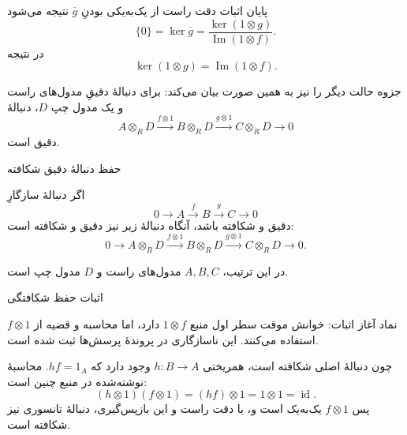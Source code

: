 \begin{frame}[t]{پایان اثبات دقت راست}
    \label{lec19:right-exact-conclusion}
    از یک‌به‌یکی بودنِ $\overline g$ نتیجه می‌شود
    \[
        \{0\}=\ker\overline g
        =\frac{\ker(1\otimes g)}{\operatorname{Im}(1\otimes f)}.
    \]
    در نتیجه
    \[
        \ker(1\otimes g)=\operatorname{Im}(1\otimes f).
    \]
    \begin{remark}
    جزوه حالت دیگر را نیز به همین صورت بیان می‌کند: برای دنبالهٔ دقیقِ
    مدول‌های راست و یک مدول چپ $D$، دنبالهٔ
    \[
        A\otimes_R D\xrightarrow{f\otimes1}
        B\otimes_R D\xrightarrow{g\otimes1}
        C\otimes_R D\longrightarrow0
    \]
    دقیق است.
    \end{remark}
\end{frame}

\begin{frame}[t]{حفظ دنبالهٔ دقیق شکافته}
    \label{lec19:split-exactness}
    \begin{theorem}
    اگر دنبالهٔ سازگارِ
    \[
        0\longrightarrow A\xrightarrow{f}B\xrightarrow{g}C\longrightarrow0
    \]
    دقیق و شکافته باشد، آنگاه دنبالهٔ زیر نیز دقیق و شکافته است:
    \[
        0\longrightarrow A\otimes_R D\xrightarrow{f\otimes1}
        B\otimes_R D\xrightarrow{g\otimes1}
        C\otimes_R D\longrightarrow0.
    \]
    \end{theorem}
    در این ترتیب، $A,B,C$ مدول‌های راست و $D$ مدول چپ است.
\end{frame}

\begin{frame}[t]{اثبات حفظ شکافتگی}
    \label{lec19:split-exactness-proof}
    \begin{alertblock}{نماد آغاز اثبات: خوانش موقت }
        سطر اول منبع $1\otimes f$ دارد، اما محاسبه و قضیه از $f\otimes1$
        استفاده می‌کنند. این ناسازگاری در پروندهٔ پرسش‌ها ثبت شده است.
    \end{alertblock}
    چون دنبالهٔ اصلی شکافته است، همریختی $h:B\longrightarrow A$ وجود دارد
    که $hf=1_A$. محاسبهٔ نوشته‌شده در منبع چنین است:
    \[
        (h\otimes1)(f\otimes1)
        =(hf)\otimes1=1\otimes1=\operatorname{id}.
    \]
    پس $f\otimes1$ یک‌به‌یک است و، با دقت راست و این بازپس‌گیری،
    دنبالهٔ تانسوری نیز شکافته است.
\end{frame}


